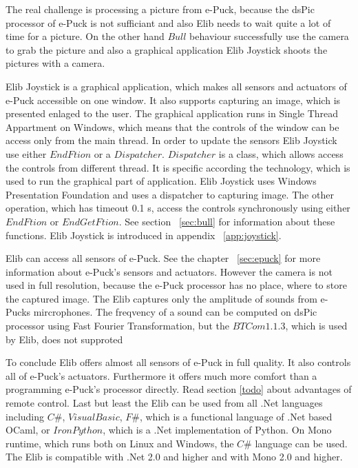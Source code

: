 	The real challenge is processing a picture from e-Puck, because the dsPic processor of e-Puck is not sufficiant
	and also Elib needs to wait quite a lot of time for a picture.
	On the other hand $Bull$ behaviour successfully use the camera to grab the picture
	and also a graphical application Elib Joystick shoots the pictures with a camera.

	Elib Joystick is a graphical application, which makes all sensors and actuators of e-Puck accessible on one window.
	It also supports capturing an image, which is presented enlaged to the user.
	The graphical application runs in Single Thread Appartment on Windows, which means that the controls of the window can 
	be access only from the main thread.
	In order to update the sensors Elib Joystick use either $EndFtion$ or a $Dispatcher$.
	$Dispatcher$ is a class, which allows access the controls from different thread. It is specific according the technology,
	which is used to run the graphical part of application. Elib Joystick uses Windows Presentation Foundation and
	uses a dispatcher to capturing image. The other operation, which has timeout 0.1 s, access the controls synchronously using
	either $EndFtion$ or $EndGetFtion$. See section ~\ref{sec:bull} for information about these functions.
	Elib Joystick is introduced in appendix ~\ref{app:joystick}.

	Elib can access all sensors of e-Puck. See the chapter ~\ref{sec:epuck} for more information about e-Puck's sensors and actuators.
	However the camera is not used in full resolution,
	because the e-Puck processor has no place, where to store the captured image.
	The Elib captures only the amplitude of sounds from e-Pucks mircrophones. The freqvency of a sound can be computed on dsPic processor
	using Fast Fourier Transformation, but the $BTCom 1.1.3$, which is used by Elib, does not supproted 

	To conclude Elib offers almost all sensors of e-Puck in full quality. It also controls all of e-Puck's actuators.
	Furthermore it offers much more comfort than a programming e-Puck's processor directly. Read section \ref{todo} about advantages
	of remote control. 
	Last but least the Elib can be used from all .Net languages including $C\#$, $Visual Basic$, $F\#$, which is a functional language of .Net based OCaml,
	or $Iron Python$, which is a .Net implementation of Python. On Mono runtime, which runs both on Linux and Windows, the $C\#$ language can be used.
	The Elib is compatible with .Net 2.0 and higher and with Mono 2.0 and higher.
